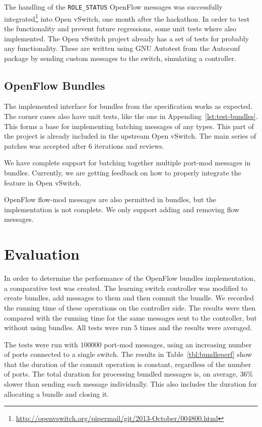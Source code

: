 The handling of the \texttt{ROLE_STATUS} OpenFlow messages was successfully integrated\footnote{\url{http://openvswitch.org/pipermail/git/2013-October/004800.html}}
into Open vSwitch, one month after the hackathon.
In order to test the functionality and prevent future regressions, some unit tests
where also implemented. The Open vSwitch project already has a set of tests for probably
any functionality. These are written using GNU Autotest from the Autoconf\cite{autoconf}
package by sending custom messages to the switch, simulating a controller.

\subsection{OpenFlow Bundles}

The implemented interface for bundles from the specification works as expected. The corner cases also
have unit tests, like the one in Appending~\ref{lst:test-bundles}. This forms a base for implementing batching messages of any types. This part
of the project is already included in the upstream Open vSwitch. The main series of patches was
accepted after 6 iterations and reviews.

We have complete support for batching together multiple port-mod messages in bundles. Currently,
we are getting feedback on how to properly integrate the feature in Open vSwitch.

OpenFlow flow-mod messages are also permitted in bundles, but the implementation is not complete.
We only support adding and removing flow messages.


\section{Evaluation}

In order to determine the performance of the OpenFlow bundles implementation, a comparative test
was created. The learning switch controller was modified to create bundles, add messages to them
and then commit the bundle. We recorded the running time of these operations on the controller side.
The results were then compared with the running time for the same messages sent to the controller,
but without using bundles. All tests were run $5$ times and the results were averaged.

The tests were run with $100000$ port-mod messages, using an increasing number of ports connected to a single
switch. The results in Table~\ref{tbl:bundleperf} show that the duration of the commit operation is constant,
regardless of the number of ports. The total duration for processing bundled messages is, on average,
$36\%$ slower than sending each message individually. This also includes the duration for allocating
a bundle and closing it.

